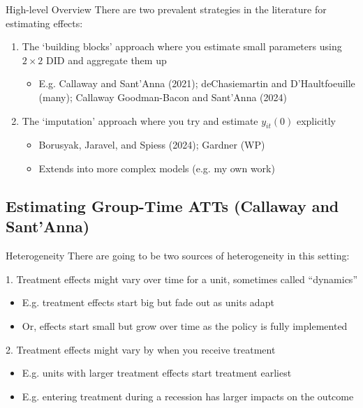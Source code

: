 \documentclass[aspectratio=169,t,11pt,table]{beamer}
\begin{document}
\begin{frame}{High-level Overview}
  There are two prevalent strategies in the literature for estimating effects:
  
  \bigskip
  \begin{enumerate}
    \item The `building blocks' approach where you estimate small parameters using $2 \times 2$ DID and aggregate them up
    \begin{itemize}
      \item E.g. Callaway and Sant'Anna (2021); deChasiemartin and D'Haultfoeuille (many); Callaway Goodman-Bacon and Sant'Anna (2024)
    \end{itemize}

    \bigskip
    \item The `imputation' approach where you try and estimate $y_{it}(0)$ explicitly
    \begin{itemize}
      \item Borusyak, Jaravel, and Spiess (2024); Gardner (WP)
      \item Extends into more complex models (e.g. my own work)
    \end{itemize}
  \end{enumerate}
\end{frame}

\subsection{Estimating Group-Time ATTs (Callaway and Sant'Anna)}

\begin{frame}{Heterogeneity}
  There are going to be two sources of heterogeneity in this setting:

  \bigskip
  \alert{1.} Treatment effects might vary over time for a unit, sometimes called ``dynamics''
  \begin{itemize}
    \item E.g. treatment effects start big but fade out as units adapt
    \item Or, effects start small but grow over time as the policy is fully implemented
  \end{itemize}

  \bigskip
  \alert{2.} Treatment effects might vary by when you receive treatment
  \begin{itemize}
    \item E.g. units with larger treatment effects start treatment earliest 
    
    \item E.g. entering treatment during a recession has larger impacts on the outcome
  \end{itemize}
\end{frame}
\end{document}
